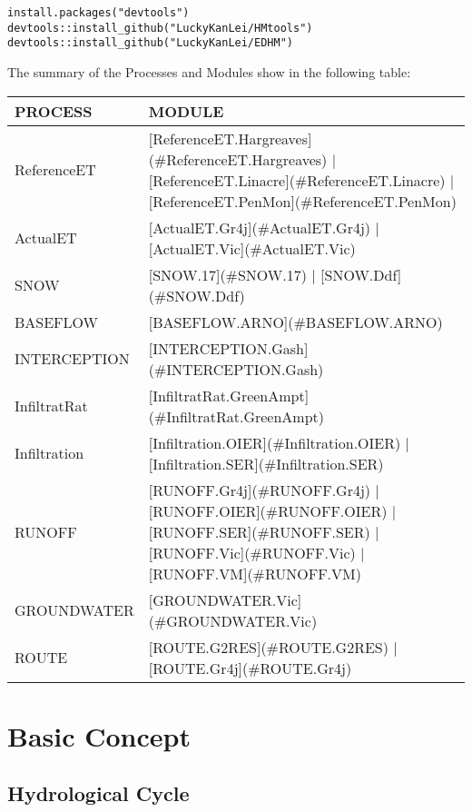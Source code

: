 \documentclass[
]{book}
\begin{document}
\begin{verbatim}
install.packages("devtools")
devtools::install_github("LuckyKanLei/HMtools")
devtools::install_github("LuckyKanLei/EDHM")
\end{verbatim}

The summary of the Processes and Modules show in the following table:

\begin{table}[!h]
\centering
\begin{tabular}{l|l}
\hline
PROCESS & MODULE\\
\hline
ReferenceET & [ReferenceET.Hargreaves](\#ReferenceET.Hargreaves) | [ReferenceET.Linacre](\#ReferenceET.Linacre) | [ReferenceET.PenMon](\#ReferenceET.PenMon)\\
\cline{1-2}
ActualET & [ActualET.Gr4j](\#ActualET.Gr4j) | [ActualET.Vic](\#ActualET.Vic)\\
\cline{1-2}
SNOW & [SNOW.17](\#SNOW.17) | [SNOW.Ddf](\#SNOW.Ddf)\\
\cline{1-2}
BASEFLOW & [BASEFLOW.ARNO](\#BASEFLOW.ARNO)\\
\cline{1-2}
INTERCEPTION & [INTERCEPTION.Gash](\#INTERCEPTION.Gash)\\
\cline{1-2}
InfiltratRat & [InfiltratRat.GreenAmpt](\#InfiltratRat.GreenAmpt)\\
\cline{1-2}
Infiltration & [Infiltration.OIER](\#Infiltration.OIER) | [Infiltration.SER](\#Infiltration.SER)\\
\cline{1-2}
RUNOFF & [RUNOFF.Gr4j](\#RUNOFF.Gr4j) | [RUNOFF.OIER](\#RUNOFF.OIER) | [RUNOFF.SER](\#RUNOFF.SER) | [RUNOFF.Vic](\#RUNOFF.Vic) | [RUNOFF.VM](\#RUNOFF.VM)\\
\cline{1-2}
GROUNDWATER & [GROUNDWATER.Vic](\#GROUNDWATER.Vic)\\
\cline{1-2}
ROUTE & [ROUTE.G2RES](\#ROUTE.G2RES) | [ROUTE.Gr4j](\#ROUTE.Gr4j)\\
\hline
\end{tabular}
\end{table}

\hypertarget{base}{%
\chapter{Basic Concept}\label{base}}

\hypertarget{hydrological-cycle}{%
\section{Hydrological Cycle}\label{hydrological-cycle}}
\end{document}
